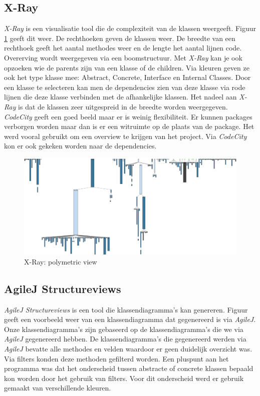 \documentclass[i1]{oss}
\begin{document}
\subsection{X-Ray} 
\emph{X-Ray} is een visualisatie tool die de complexiteit van de klassen weergeeft. Figuur \ref{fig:X-Ray} geeft dit weer. De rechthoeken geven de klassen weer. De breedte van een rechthoek geeft het aantal methodes weer en de lengte het aantal lijnen code. Overerving wordt weergegeven via een boomstructuur. Met \emph{X-Ray} kan je ook opzoeken wie de parents zijn van een klasse of de children. Via kleuren geven ze ook het type klasse mee: Abstract, Concrete, Interface en Internal Classes. Door een klasse te selecteren kan men de dependencies zien van deze klasse via rode lijnen die deze klasse verbinden met de afhankelijke klassen. Het nadeel aan \emph{X-Ray} is dat de klassen zeer uitgespreid in de breedte worden weergegeven. \\
\emph{CodeCity} geeft een goed beeld maar er is weinig flexibiliteit. Er kunnen packages verborgen worden maar dan is er een witruimte op de plaats van de package. Het werd vooral gebruikt om een overview te krijgen van het project. Via \emph{CodeCity} kon er ook gekeken worden naar de dependencies. 


\begin{figure}[hb!]
	\centering
	\includegraphics[width=\textwidth]{XRayComplexity}
	\caption{X-Ray: polymetric view}
	\label{fig:X-Ray}
\end{figure}

\subsection{AgileJ Structureviews}
\emph{AgileJ Structureviews} is een tool die klassendiagramma's kan genereren. Figuur \label{fig:AgileJklassendia} geeft een voorbeeld weer van een klassendiagramma dat gegenereerd is via \emph{AgileJ}.\\
Onze klassendiagramma's zijn gebaseerd op de klassendiagramma's die we via \emph{AgileJ} gegenereerd hebben. De klassendiagramma's die gegenereerd werden via \emph{AgileJ} bevatte alle methodes en velden waardoor er geen duidelijk overzicht was. Via filters konden deze methoden gefilterd worden. Een pluspunt aan het programma was dat het onderscheid tussen abstracte of concrete klassen bepaald kon worden door het gebruik van filters. Voor dit onderscheid werd er gebruik gemaakt van verschillende kleuren.\\
\end{document}
